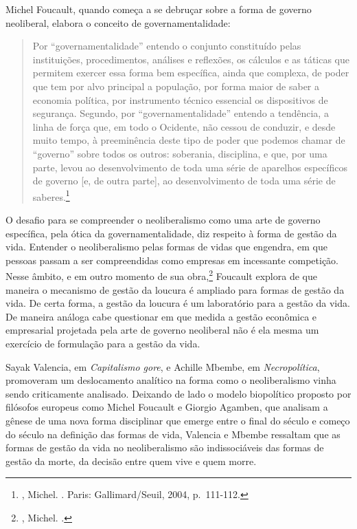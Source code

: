 Michel Foucault, quando começa a se debruçar sobre a forma de governo
neoliberal, elabora o conceito de governamentalidade:

\begin{quote}
Por ``governamentalidade'' entendo o conjunto constituído pelas
instituições, procedimentos, análises e reﬂexões, os cálculos e as
táticas que permitem exercer essa forma bem especíﬁca, ainda que
complexa, de poder que tem por alvo principal a população, por forma
maior de saber a economia política, por instrumento técnico essencial os
dispositivos de segurança. Segundo, por ``governamentalidade'' entendo a
tendência, a linha de força que, em todo o Ocidente, não cessou de
conduzir, e desde muito tempo, à preeminência deste tipo de poder que
podemos chamar de ``governo'' sobre todos os outros: soberania,
disciplina, e que, por uma parte, levou ao desenvolvimento de toda uma
série de aparelhos especíﬁcos de governo {[}e, de outra parte{]}, ao
desenvolvimento de toda uma série de saberes.\footnote{,
  Michel. {}. Paris: Gallimard/Seuil, 2004, p.~111-112.}
\end{quote}

O desafio para se compreender o neoliberalismo como uma arte de governo
específica, pela ótica da governamentalidade, diz respeito à forma de
gestão da vida. Entender o neoliberalismo pelas formas de vidas que
engendra, em que pessoas passam a ser compreendidas como empresas em
incessante competição. Nesse âmbito, e em outro momento de sua
obra,\footnote{, Michel. {}.}
Foucault explora de que maneira o mecanismo de gestão da loucura é
ampliado para formas de gestão da vida. De certa forma, a gestão da
loucura é um laboratório para a gestão da vida. De maneira análoga cabe
questionar em que medida a gestão econômica e empresarial projetada pela
arte de governo neoliberal não é ela mesma um exercício de formulação
para a gestão da vida.

Sayak Valencia, em \emph{Capitalismo gore}, e Achille Mbembe, em
\emph{Necropolítica}, promoveram um deslocamento analítico na forma como
o neoliberalismo vinha sendo criticamente analisado. Deixando de lado o
modelo biopolítico proposto por filósofos europeus como Michel Foucault
e Giorgio Agamben, que analisam a gênese de uma nova forma disciplinar
que emerge entre o final do século  e começo do século  na
definição das formas de vida, Valencia e Mbembe ressaltam que as formas
de gestão da vida no neoliberalismo são indissociáveis das formas de
gestão da morte, da decisão entre quem vive e quem morre.


